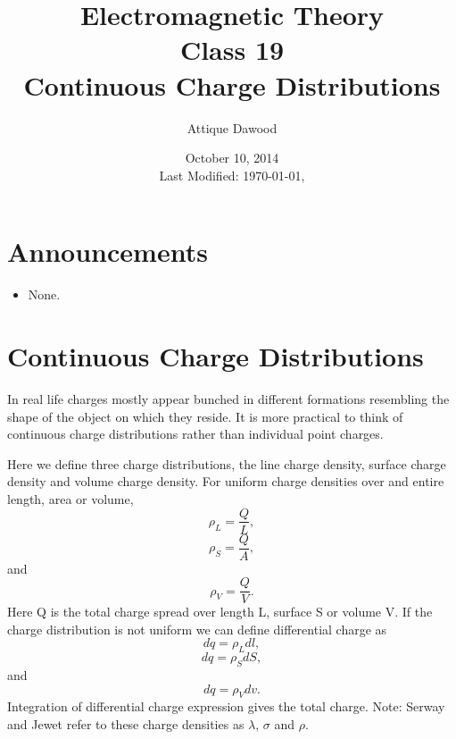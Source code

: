 \documentclass[12pt,a4paper]{article}
\title{Electromagnetic Theory\\Class 19\\Continuous Charge Distributions}
\author{Attique Dawood}
\date{October 10, 2014\\[0.2cm] Last Modified: \today, \currenttime}
\begin{document}
\maketitle
\section{Announcements}
\begin{itemize}
\item None.
\end{itemize}
\section{Continuous Charge Distributions}
In real life charges mostly appear bunched in different formations resembling the shape of the object on which they reside. It is more practical to think of continuous charge distributions rather than individual point charges.

Here we define three charge distributions, the line charge density, surface charge density and volume charge density. For uniform charge densities over and entire length, area or volume,
\begin{equation}
\rho_L=\dfrac{Q}{L},
\end{equation}
\begin{equation}
\rho_S=\dfrac{Q}{A},
\end{equation}
and
\begin{equation}
\rho_V=\dfrac{Q}{V}.
\end{equation}
Here Q is the total charge spread over length L, surface S or volume V. If the charge distribution is not uniform we can define differential charge as
\begin{equation}
dq=\rho_Ldl,
\end{equation}
\begin{equation}
dq=\rho_SdS,
\end{equation}
and
\begin{equation}
dq=\rho_Vdv.
\end{equation}
Integration of differential charge expression gives the total charge.
Note: Serway and Jewet \cite{Serway} refer to these charge densities as $\lambda$, $\sigma$ and $\rho$.
\end{document}
